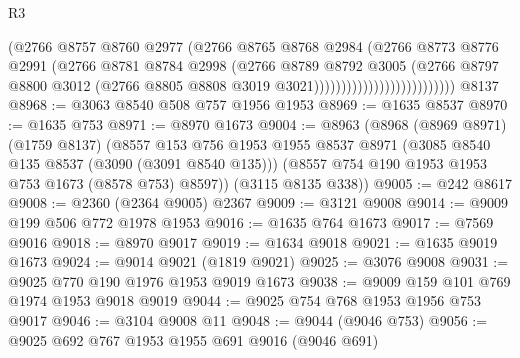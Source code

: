 \begin{lexlean}{R3}
\begin{coremodule}
                                          (@2766
                                            @8757
                                            @8760
                                            @2977
                                            (@2766
                                              @8765
                                              @8768
                                              @2984
                                              (@2766
                                                @8773
                                                @8776
                                                @2991
                                                (@2766
                                                  @8781
                                                  @8784
                                                  @2998
                                                  (@2766
                                                    @8789
                                                    @8792
                                                    @3005
                                                    (@2766
                                                      @8797
                                                      @8800
                                                      @3012
                                                      (@2766
                                                        @8805
                                                        @8808
                                                        @3019
                                                        @3021))))))))))))))))))))))))))
    @8137
@8968 := @3063 @8540 @508 @757 @1956 @1953
@8969 := @1635 @8537
@8970 := @1635 @753
@8971 := @8970 @1673
@9004 := @8963
    (@8968
      (@8969 @8971)
      (@1759 @8137)
      (@8557
        @153
        @756
        @1953
        @1955
        @8537
        @8971
        (@3085 @8540 @135 @8537 (@3090 (@3091 @8540 @135)))
        (@8557 @754 @190 @1953 @1953 @753 @1673 (@8578 @753) @8597))
      (@3115 @8135 @338))
@9005 := @242 @8617
@9008 := @2360 (@2364 @9005) @2367
@9009 := @3121 @9008
@9014 := @9009 @199 @506 @772 @1978 @1953
@9016 := @1635 @764 @1673
@9017 := @7569 @9016
@9018 := @8970 @9017
@9019 := @1634 @9018
@9021 := @1635 @9019 @1673
@9024 := @9014 @9021 (@1819 @9021)
@9025 := @3076 @9008
@9031 := @9025 @770 @190 @1976 @1953 @9019 @1673
@9038 := @9009 @159 @101 @769 @1974 @1953 @9018 @9019
@9044 := @9025 @754 @768 @1953 @1956 @753 @9017
@9046 := @3104 @9008 @11
@9048 := @9044 (@9046 @753)
@9056 := @9025 @692 @767 @1953 @1955 @691 @9016 (@9046 @691)

\end{coremodule}
\end{lexlean}
